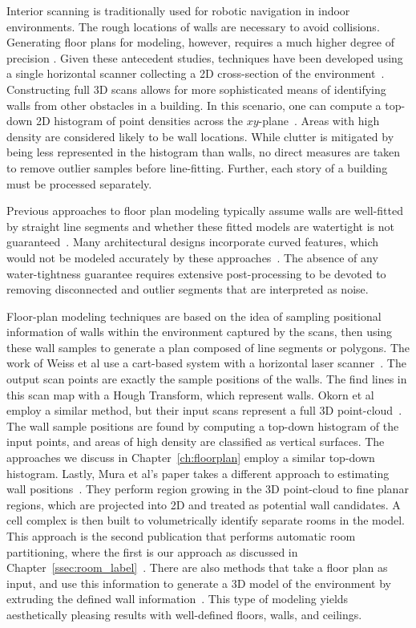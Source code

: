 \documentclass[12pt,onecolumn,oneside]{book}
\begin{document}
Interior scanning is traditionally used for robotic navigation in indoor environments.  The rough locations of walls are necessary to avoid collisions.  Generating floor plans for modeling, however, requires a much higher degree of precision \cite{Okorn09}.  Given these antecedent studies, techniques have been developed using a single horizontal scanner collecting a 2D cross-section of the environment~\cite{Weiss05}.  Constructing full 3D scans allows for more sophisticated means of identifying walls from other obstacles in a building.  In this scenario, one can compute a top-down 2D histogram of point densities across the $xy$-plane~\cite{Okorn09}.  Areas with high density are considered likely to be wall locations.  While clutter is mitigated by being less represented in the histogram than walls, no direct measures are taken to remove outlier samples before line-fitting.  Further, each story of a building must be processed separately.

Previous approaches to floor plan modeling typically assume walls are well-fitted by straight line segments and whether these fitted models are watertight is not guaranteed~\cite{Nuchter03, Okorn09, Weiss05}.  Many architectural designs incorporate curved features, which would not be modeled accurately by these approaches~\cite{Castles07,Turner12}. The absence of any water-tightness guarantee requires extensive post-processing to be devoted to removing disconnected and outlier segments that are interpreted as noise.

Floor-plan modeling techniques are based on the idea of sampling positional information of walls within the environment captured by the scans, then using these wall samples to generate a plan composed of line segments or polygons.  The work of Weiss et al use a cart-based system with a horizontal laser scanner~\cite{Weiss05}.  The output scan points are exactly the sample positions of the walls.  The find lines in this scan map with a Hough Transform, which represent walls.  Okorn et al employ a similar method, but their input scans represent a full 3D point-cloud~\cite{Okorn09}.  The wall sample positions are found by computing a top-down histogram of the input points, and areas of high density are classified as vertical surfaces.  The approaches we discuss in Chapter~\ref{ch:floorplan} employ a similar top-down histogram.  Lastly, Mura et al's paper takes a different approach to estimating wall positions~\cite{Mura13}.  They perform region growing in the 3D point-cloud to fine planar regions, which are projected into 2D and treated as potential wall candidates.  A cell complex is then built to volumetrically identify separate rooms in the model.  This approach is the second publication that performs automatic room partitioning, where the first is our approach as discussed in Chapter~\ref{ssec:room_label}~\cite{Turner14}.  There are also methods that take a floor plan as input, and use this information to generate a 3D model of the environment by extruding the defined wall information~\cite{Or05,Lewis98}.  This type of modeling yields aesthetically pleasing results with well-defined floors, walls, and ceilings.
\end{document}
